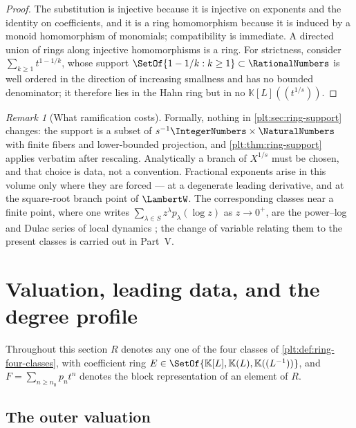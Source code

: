 \documentclass[11pt,oneside]{article}
\theoremstyle{plain}
\theoremstyle{definition}
\theoremstyle{remark}
\newtheorem{remark}[theorem]{Remark}
\newcommand{\K}{\mathbb{K}}
\begin{document}
\begin{proof}
The substitution is injective because it is injective on exponents and the
identity on coefficients, and it is a ring homomorphism because it is induced
by a monoid homomorphism of monomials; compatibility is immediate.  A directed
union of rings along injective homomorphisms is a ring.  For strictness,
consider \(\sum_{k\ge1}t^{1-1/k}\), whose support
\(\SetOf{1-1/k:k\ge1}\subset\RationalNumbers\) is well ordered in the
direction of increasing smallness and has no bounded denominator; it therefore
lies in the Hahn ring but in no \(\K[L]((t^{1/s}))\).
\end{proof}

\begin{remark}[What ramification costs]
\label{plt:rmk:ring-puiseux-cost}
Formally, nothing in \cref{plt:sec:ring-support} changes: the support is a
subset of \(s^{-1}\IntegerNumbers\times\NaturalNumbers\) with finite fibers and
lower-bounded projection, and \cref{plt:thm:ring-support} applies verbatim
after rescaling.  Analytically a branch of \(X^{1/s}\) must be chosen, and
that choice is data, not a convention.  Fractional exponents arise in this
volume only where they are forced --- at a degenerate leading derivative, and
at the square-root branch point of \(\LambertW\).  The corresponding classes
near a finite point, where one writes \(\sum_{\lambda\in S}z^{\lambda}
p_\lambda(\log z)\) as \(z\to0^+\), are the power--log and Dulac series of
local dynamics
\cite{mardesic-normalforms,mardesic-length,resman-dulac,peran-logtransseries};
the change of variable relating them to the present classes is carried out in
Part~V.
\end{remark}

\section{Valuation, leading data, and the degree profile}
\label{plt:sec:leading-data}

Throughout this section \(R\) denotes any one of the four classes of
\cref{plt:def:ring-four-classes}, with coefficient ring
\(E\in\SetOf{\K[L],\K(L),\K((L^{-1}))}\), and \(F=\sum_{n\ge n_0}p_nt^n\)
denotes the block representation of an element of \(R\).

\subsection{The outer valuation}
\label{plt:sec:lead-outer-valuation}
\end{document}

